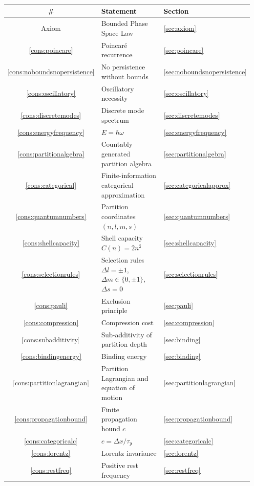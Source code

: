 \documentclass[11pt,twocolumn,a4paper]{article}
\theoremstyle{axiomstyle}
\theoremstyle{conseqstyle}
\theoremstyle{definition}
\theoremstyle{remark}
\newcommand{\taup}{\tau_{\mathrm{p}}}
\begin{document}
\begin{center}
\small
\begin{tabular}{c|l|l}
\toprule
\# & Statement & Section\\
\midrule
Axiom & Bounded Phase Space Law & \ref{sec:axiom}\\
\ref{cons:poincare} & Poincar\'e recurrence & \ref{sec:poincare}\\
\ref{cons:noboundsnopersistence} & No persistence without bounds & \ref{sec:noboundsnopersistence}\\
\ref{cons:oscillatory} & Oscillatory necessity & \ref{sec:oscillatory}\\
\ref{cons:discretemodes} & Discrete mode spectrum & \ref{sec:discretemodes}\\
\ref{cons:energyfrequency} & $E=\hbar\omega$ & \ref{sec:energyfrequency}\\
\ref{cons:partitionalgebra} & Countably generated partition algebra & \ref{sec:partitionalgebra}\\
\ref{cons:categorical} & Finite-information categorical approximation & \ref{sec:categoricalapprox}\\
\ref{cons:quantumnumbers} & Partition coordinates $(n,l,m,s)$ & \ref{sec:quantumnumbers}\\
\ref{cons:shellcapacity} & Shell capacity $C(n)=2n^{2}$ & \ref{sec:shellcapacity}\\
\ref{cons:selectionrules} & Selection rules $\Delta l=\pm 1$, $\Delta m\in\{0,\pm 1\}$, $\Delta s=0$ & \ref{sec:selectionrules}\\
\ref{cons:pauli} & Exclusion principle & \ref{sec:pauli}\\
\ref{cons:compression} & Compression cost & \ref{sec:compression}\\
\ref{cons:subadditivity} & Sub-additivity of partition depth & \ref{sec:binding}\\
\ref{cons:bindingenergy} & Binding energy & \ref{sec:binding}\\
\ref{cons:partitionlagrangian} & Partition Lagrangian and equation of motion & \ref{sec:partitionlagrangian}\\
\ref{cons:propagationbound} & Finite propagation bound $c$ & \ref{sec:propagationbound}\\
\ref{cons:categoricalc} & $c=\Delta x/\taup$ & \ref{sec:categoricalc}\\
\ref{cons:lorentz} & Lorentz invariance & \ref{sec:lorentz}\\
\ref{cons:restfreq} & Positive rest frequency & \ref{sec:restfreq}\\

\end{tabular}
\end{center}
\end{document}
